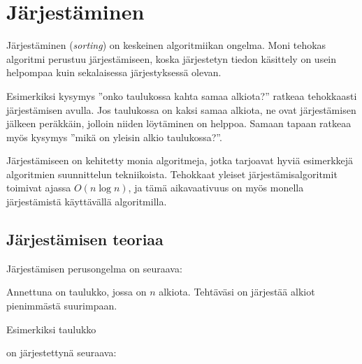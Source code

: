 \chapter{Järjestäminen}


Järjestäminen (\textit{sorting})
on keskeinen algoritmiikan ongelma.
Moni tehokas algoritmi
perustuu järjestämiseen,
koska järjestetyn tiedon
käsittely on usein helpompaa
kuin sekalaisessa järjestyksessä olevan.

Esimerkiksi kysymys ''onko taulukossa kahta samaa
alkiota?'' ratkeaa tehokkaasti järjestämisen avulla.
Jos taulukossa on kaksi samaa alkiota,
ne ovat järjestämisen jälkeen peräkkäin,
jolloin niiden löytäminen on helppoa.
Samaan tapaan ratkeaa myös kysymys
''mikä on yleisin alkio taulukossa?''.

Järjestämiseen on kehitetty monia
algoritmeja, jotka tarjoavat hyviä
esimerkkejä algoritmien suunnittelun tekniikoista.
Tehokkaat yleiset järjestämis\-algoritmit
toimivat ajassa $O(n \log n)$, ja tämä aikavaativuus
on myös monella järjestämistä käyttävällä algoritmilla.

\section{Järjestämisen teoriaa}

Järjestämisen perusongelma on seuraava:

\begin{task}
Annettuna on taulukko, jossa on $n$ alkiota.
Tehtäväsi on järjestää alkiot pienimmästä
suurimpaan.
\end{task}

\noindent
Esimerkiksi taulukko

\begin{center}
\end{center}

\noindent
on järjestettynä seuraava:

